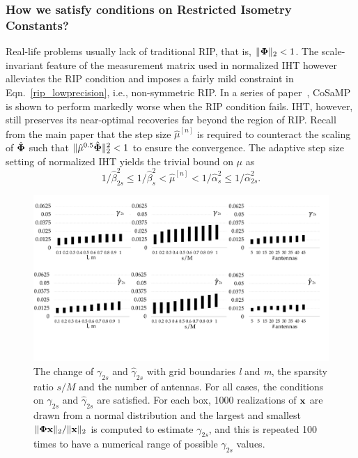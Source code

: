 \documentclass[aoas,preprint]{imsart}
\numberwithin{equation}{section}
\theoremstyle{plain}
\begin{document}
{\subsubsection{How we satisfy conditions on Restricted Isometry Constants?}
Real-life problems usually lack of traditional RIP, that is, $\|{\bf \Phi}\|_2 < 1$. The scale-invariant feature of the measurement matrix used in normalized IHT however alleviates the RIP condition and imposes a fairly mild constraint in Eqn.~\ref{rip_lowprecision}, i.e., non-symmetric RIP. In a series of paper~\cite{blumensath2010niht, blumensath2012greedy}, CoSaMP is shown to perform markedly worse when the RIP condition fails. IHT, however, still preserves its near-optimal recoveries far beyond the region of RIP. %
Recall from the main paper that the step size $\hat{\mu}^{[n]}$ is required to counteract the scaling of $\hat{{\bf \Phi}}$ such that $\|\hat{\mu}^{0.5} \hat{\bf\Phi}\|_2^2 <1$ to ensure the convergence. 
The adaptive step size setting of normalized IHT yields the trivial bound on $\mu$ as~\cite{blumensath2012greedy}
\begin{equation}
   1/\hat{\beta}_{2s}^2\leq  1/\hat{\beta}_s^2 < \hat{\mu}^{[n]} < 1/\hat{\alpha}_s^2 \leq 1/\hat{\alpha}_{2s}^2.
\end{equation}
\begin{figure}[t!]
\centering
\includegraphics[width=1\columnwidth, angle=0]{figs/gamma.pdf}
\caption{The change of $\gamma_{2s}$ and $\hat{\gamma}_{2s}$ with grid boundaries {\it l} and {\it m}, the sparsity ratio $s/M$ and the number of antennas. For all cases, the conditions on $\gamma_{2s}$ and $\hat{\gamma}_{2s}$ are satisfied. For each box, 1000 realizations of ${\bf x}$ are drawn from a normal distribution and the largest and smallest $\|{\bf \Phi x} \|_2/\| {\bf x}\|_2$ is computed to estimate $\gamma_{2s}$, and this is repeated 100 times to have a numerical range of possible ${\gamma}_{2s}$ values. }
\label{fig:gamma}
\end{figure}

}
\end{document}
